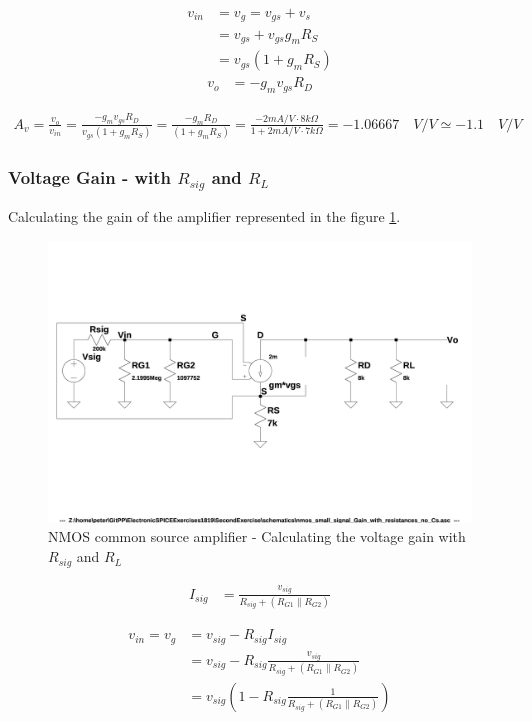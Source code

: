 \documentclass[10pt,a4paper]{book}
\begin{document}
\begin{align}
v_{in} &= v_{g} = v_{gs}+v_s\\
&= v_{gs} + v_{gs} g_m R_S\\
&= v_{gs}(1+ g_m R_S)
\end{align}
\begin{align}
v_{o} &= - g_m v_{gs} R_D
\end{align}

\begin{align}
A_v = \frac{v_o}{v_{in}} = \frac{- g_m v_{gs} R_D}{v_{gs}(1+ g_m R_S)} = \frac{- g_m R_D}{(1+ g_m R_S)} = \frac{- 2mA/V \cdot 8k\Omega}{1+2mA/V \cdot 7k\Omega} = - 1.06667 \quad V/V \simeq - 1.1 \quad V/V
\end{align}

\subsubsection{Voltage Gain - with $R_{sig}$ and $R_L$}
Calculating the gain of the amplifier represented in the figure \ref{nmos_pi_gain_with_resistances_no_Cs}.

\begin{figure}[h]
  \centering
  \includegraphics[width=12cm]{schematics/nmos_small_signal_with_resistances_no_Cs.jpg}
  \caption{NMOS common source amplifier - Calculating the voltage gain with $R_{sig}$ and $R_L$}
  \label{nmos_pi_gain_with_resistances_no_Cs}
\end{figure}

\begin{align}
I_{sig} &= \frac{v_{sig}}{R_{sig} + (R_{G1} \parallel R_{G2})}
\end{align}

\begin{align}
v_{in} = v_{g} &= v_{sig} - R_{sig} I_{sig}\\
&= v_{sig} - R_{sig} \frac{v_{sig}}{R_{sig} + (R_{G1} \parallel R_{G2})}\\
&= v_{sig} \left(1 - R_{sig} \frac{1}{R_{sig} + (R_{G1} \parallel R_{G2})}\right)
\end{align}
\end{document}
